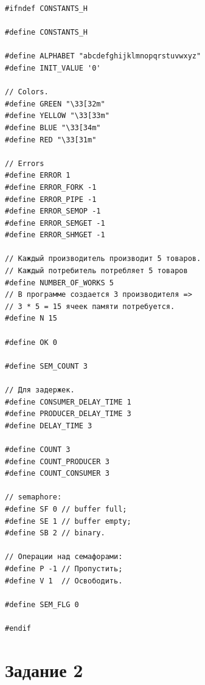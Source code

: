 \begin{lstlisting}[label=some-code,caption=Файл с константами]
#ifndef CONSTANTS_H

#define CONSTANTS_H

#define ALPHABET "abcdefghijklmnopqrstuvwxyz"
#define INIT_VALUE '0'

// Colors.
#define GREEN "\33[32m"
#define YELLOW "\33[33m"
#define BLUE "\33[34m"
#define RED "\33[31m"

// Errors
#define ERROR 1
#define ERROR_FORK -1
#define ERROR_PIPE -1
#define ERROR_SEMOP -1
#define ERROR_SEMGET -1
#define ERROR_SHMGET -1

// Каждый производитель производит 5 товаров.
// Каждый потребитель потребляет 5 товаров
#define NUMBER_OF_WORKS 5
// В программе создается 3 производителя =>
// 3 * 5 = 15 ячеек памяти потребуется.
#define N 15

#define OK 0

#define SEM_COUNT 3

// Для задержек.
#define CONSUMER_DELAY_TIME 1
#define PRODUCER_DELAY_TIME 3
#define DELAY_TIME 3

#define COUNT 3
#define COUNT_PRODUCER 3
#define COUNT_CONSUMER 3

// semaphore:
#define SF 0 // buffer full;
#define SE 1 // buffer empty;
#define SB 2 // binary.

// Операции над семафорами:
#define P -1 // Пропустить;
#define V 1	 // Освободить.

#define SEM_FLG 0

#endif
\end{lstlisting}

\section{Задание 2}

